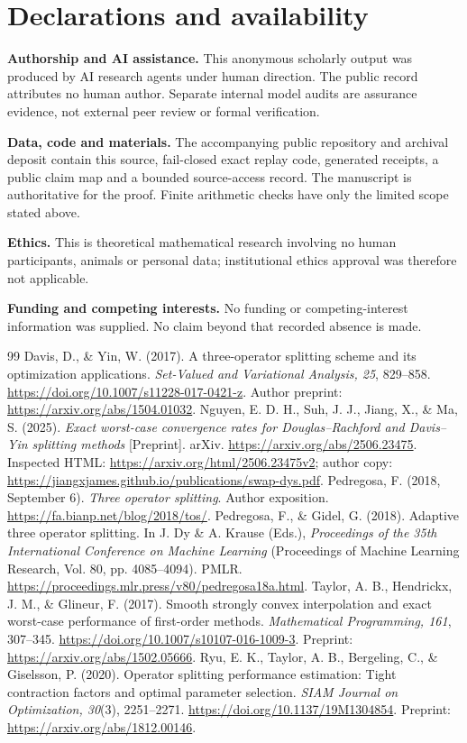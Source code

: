 \documentclass[11pt,a4paper]{article}
\theoremstyle{remark}\newtheorem{remark}[theorem]{Remark}
\begin{document}
\section*{Declarations and availability}

\textbf{Authorship and AI assistance.} This anonymous scholarly output was produced by AI research agents under human direction. The public record attributes no human author. Separate internal model audits are assurance evidence, not external peer review or formal verification.

\textbf{Data, code and materials.} The accompanying public repository and archival deposit contain this source, fail-closed exact replay code, generated receipts, a public claim map and a bounded source-access record. The manuscript is authoritative for the proof. Finite arithmetic checks have only the limited scope stated above.

\textbf{Ethics.} This is theoretical mathematical research involving no human participants, animals or personal data; institutional ethics approval was therefore not applicable.

\textbf{Funding and competing interests.} No funding or competing-interest information was supplied. No claim beyond that recorded absence is made.

\begin{thebibliography}{99}
 Davis, D., \& Yin, W. (2017). A three-operator splitting scheme and its optimization applications. \emph{Set-Valued and Variational Analysis, 25}, 829--858. \url{https://doi.org/10.1007/s11228-017-0421-z}. Author preprint: \url{https://arxiv.org/abs/1504.01032}.
 Nguyen, E. D. H., Suh, J. J., Jiang, X., \& Ma, S. (2025). \emph{Exact worst-case convergence rates for Douglas--Rachford and Davis--Yin splitting methods} [Preprint]. arXiv. \url{https://arxiv.org/abs/2506.23475}. Inspected HTML: \url{https://arxiv.org/html/2506.23475v2}; author copy: \url{https://jiangxjames.github.io/publications/swap-dys.pdf}.
 Pedregosa, F. (2018, September 6). \emph{Three operator splitting}. Author exposition. \url{https://fa.bianp.net/blog/2018/tos/}.
 Pedregosa, F., \& Gidel, G. (2018). Adaptive three operator splitting. In J. Dy \& A. Krause (Eds.), \emph{Proceedings of the 35th International Conference on Machine Learning} (Proceedings of Machine Learning Research, Vol. 80, pp. 4085--4094). PMLR. \url{https://proceedings.mlr.press/v80/pedregosa18a.html}.
 Taylor, A. B., Hendrickx, J. M., \& Glineur, F. (2017). Smooth strongly convex interpolation and exact worst-case performance of first-order methods. \emph{Mathematical Programming, 161}, 307--345. \url{https://doi.org/10.1007/s10107-016-1009-3}. Preprint: \url{https://arxiv.org/abs/1502.05666}.
 Ryu, E. K., Taylor, A. B., Bergeling, C., \& Giselsson, P. (2020). Operator splitting performance estimation: Tight contraction factors and optimal parameter selection. \emph{SIAM Journal on Optimization, 30}(3), 2251--2271. \url{https://doi.org/10.1137/19M1304854}. Preprint: \url{https://arxiv.org/abs/1812.00146}.
\end{thebibliography}
\end{document}
